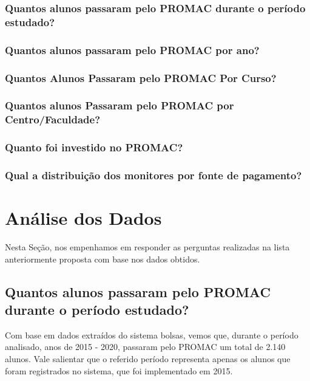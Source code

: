 \documentclass[12pt,a4paper]{article}
\begin{document}
        	\subsubsection{Quantos alunos passaram pelo PROMAC durante o período estudado?}

        	\subsubsection{Quantos alunos passaram pelo PROMAC por ano?}

        	\subsubsection{Quantos Alunos Passaram pelo PROMAC Por Curso?}

       		\subsubsection{Quantos alunos Passaram pelo PROMAC por Centro/Faculdade?}

        	\subsubsection{Quanto foi investido no PROMAC?}

        	\subsubsection{Qual a distribuição dos monitores por fonte de pagamento?}

    \pagebreak

    \section{Análise dos Dados}
    Nesta Seção, nos empenhamos em responder as perguntas realizadas na lista anteriormente proposta com base nos dados 			obtidos.

        \subsection{Quantos alunos passaram pelo PROMAC durante o período estudado?}
        Com base em dados extraídos do sistema bolsas, vemos que, durante o período analisado, anos de 2015 - 2020, passaram 			pelo PROMAC um total de 2.140 alunos. Vale salientar que o referido período representa apenas os alunos que foram 				registrados no sistema, que foi implementado em 2015.
\end{document}
